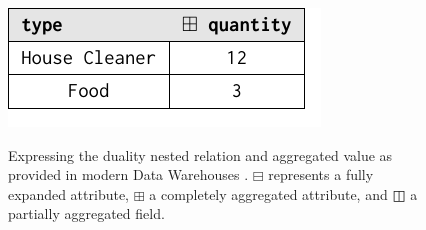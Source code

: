 \begin{figure}[!t]
\begin{minipage}[t]{0.7\textwidth}
\centering
	\includegraphics[scale=0.7]{fig/01dataint/032aggregrated}
	\label{fig:ag4}
\end{minipage}
\caption{Expressing the duality nested relation and aggregated value as provided in modern Data Warehouses \cite{Pentaho,Parra}. $\boxminus$ represents a fully expanded attribute, $\boxplus$ a completely aggregated attribute, and $\boxbar$ a partially aggregated field.}
\label{fig:introducingModel}
\end{figure}


